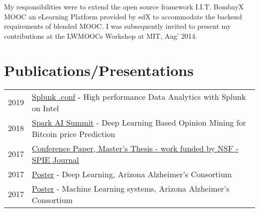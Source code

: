 \documentclass[hidelinks,letterpaper]{deedy-resume-openfont} %
\begin{document}
\begin{minipage}[t]{0.66\textwidth}
\small My responsibilities were to extend the open source framework I.I.T. BombayX MOOC  an eLearning Platform provided by edX to accommodate the backend requirements of blended MOOC. I was subsequently invited to present my contributions at the LWMOOCs Workshop at MIT, Aug' 2014.




\section{Publications/Presentations} 

\begin{tabular}{rl}
2019     & \href{https://www.intel.com/content/dam/www/public/us/en/documents/solution-briefs/splunk-high-performance-data-analytics-brief.pdf}{\underline{Splunk .conf}} - High performance Data Analytics with Splunk on Intel \\
2018     & \href{https://databricks.com/session/deep-learning-based-opinion-mining-for-bitcoin-price-prediction}{\underline{Spark AI Summit}} - Deep Learning Based Opinion Mining for Bitcoin price Prediction \\
2017     & \href{https://www.researchgate.net/publication/321141639_Deep_Learning_based_Classification_of_FDG-PET_Data_for_Alzheimers_Disease_Categories}{\underline{Conference Paper}, Master's Thesis - work funded by NSF - SPIE Journal} \\
2017	 & \href{http://gsl.lab.asu.edu/archive/Posters/AAC2017_Singh_DeepLearning.pdf}{\underline{Poster}} - Deep Learning, Arizona Alzheimer's Consortium \\
2017     & \href{http://gsl.lab.asu.edu/archive/Posters/AAC2017_Srivastava_3DPatch.pdf}{\underline{Poster}} - Machine Learning systems, Arizona Alzheimer's Consortium \\
\end{tabular}


\end{minipage}
\end{document}
